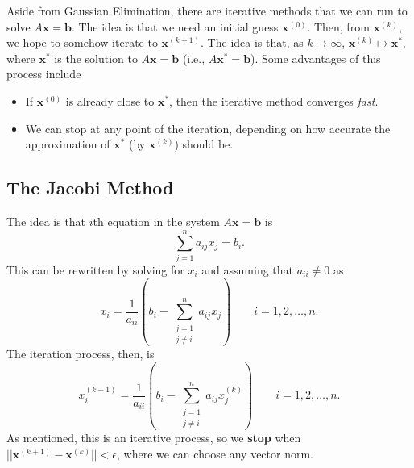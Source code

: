 \documentclass[letterpaper]{article}
\newcommand{\0}{\mathbf{0}}
\renewcommand{\b}{\mathbf{b}}
\newcommand{\x}{\mathbf{x}}
\begin{document}
Aside from Gaussian Elimination, there are iterative methods that we can run to solve $A\x = \b$. The idea is that we need an initial guess $\x^{(0)}$. Then, from $\x^{(k)}$, we hope to somehow iterate to $\x^{(k + 1)}$. The idea is that, as $k \mapsto \infty$, $\x^{(k)} \mapsto \x^*$, where $\x^*$ is the solution to $A\x = \b$ (i.e., $A\x^* = \b$). Some advantages of this process include 
\begin{itemize}
    \item If $\x^{(0)}$ is already close to $\x^*$, then the iterative method converges \emph{fast}.
    \item We can stop at any point of the iteration, depending on how accurate the approximation of $\x^*$ (by $\x^{(k)}$) should be. 
\end{itemize}

\subsection{The Jacobi Method}
The idea is that $i$th equation in the system $A\x = \b$ is 
\[\sum_{j = 1}^{n} a_{ij}x_j = b_i.\]
This can be rewritten by solving for $x_i$ and assuming that $a_{ii} \neq 0$ as 
\[x_i = \frac{1}{a_{ii}}\left(b_{i} - \sum_{\substack{j = 1 \\ j \neq i}}^n a_{ij}x_{j}\right) \qquad i = 1, 2, \hdots, n.\]
The iteration process, then, is 
\[\boxed{x_{i}^{(k + 1)} = \frac{1}{a_{ii}} \left(b_{i} - \sum_{\substack{j = 1 \\ j \neq i}}^n a_{ij}x_{j}^{(k)}\right)} \qquad i = 1, 2, \hdots, n.\]
As mentioned, this is an iterative process, so we \textbf{stop} when $||\x^{(k + 1)} - \x^{(k)}|| < \epsilon$, where we can choose any vector norm. 
\end{document}
